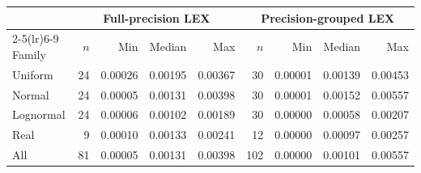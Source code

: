 \begin{tabular}{@{}l rrrr rrrr@{}}
\toprule
 & \multicolumn{4}{c}{Full-precision LEX} & \multicolumn{4}{c}{Precision-grouped LEX} \\
\cmidrule(lr){2-5}\cmidrule(lr){6-9}
Family & $n$ & Min & Median & Max & $n$ & Min & Median & Max \\
\midrule
Uniform & 24 & 0.00026 & 0.00195 & 0.00367 & 30 & 0.00001 & 0.00139 & 0.00453 \\
Normal & 24 & 0.00005 & 0.00131 & 0.00398 & 30 & 0.00001 & 0.00152 & 0.00557 \\
Lognormal & 24 & 0.00006 & 0.00102 & 0.00189 & 30 & 0.00000 & 0.00058 & 0.00207 \\
Real & 9 & 0.00010 & 0.00133 & 0.00241 & 12 & 0.00000 & 0.00097 & 0.00257 \\
\midrule
All & 81 & 0.00005 & 0.00131 & 0.00398 & 102 & 0.00000 & 0.00101 & 0.00557 \\
\bottomrule
\end{tabular}
